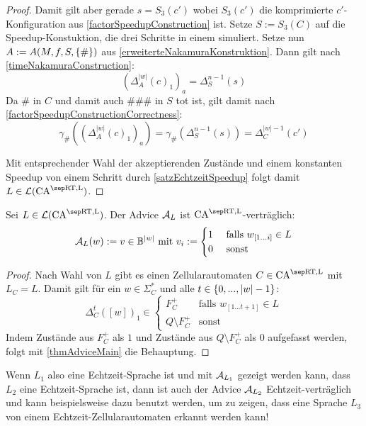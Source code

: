 \begin{proof}
    Damit gilt aber gerade $s = S_3(c')$ wobei $S_3(c')$ die komprimierte $c'$-Konfiguration aus \cref{factorSpeedupConstruction} ist.
    Setze $S := S_3(C)$ auf die Speedup-Konstuktion, die drei Schritte in einem simuliert.
    Setze nun $A := A(M, f, S, \{ {\#} \})$ aus \cref{erweiterteNakamuraKonstruktion}.
    Dann gilt nach \cref{timeNakamuraConstruction}:
    \[
        (\Delta^{ |w| }_A(c)_1)_a = \Delta_S^{n - 1}(s)
    \]
    Da $\#$ in $C$ und damit auch $\#\#\#$ in $S$ tot ist, gilt damit nach \cref{factorSpeedupConstructionCorrectness}:
    \[
        \gamma_\#((\Delta^{ |w| }_A(c)_1)_a) = \gamma_\#(\Delta_S^{n-1}(s)) = \Delta_C^{|w| - 1}(c')
    \]
    
    Mit entsprechender Wahl der akzeptierenden Zustände und einem konstanten Speedup von einem Schritt
    durch \cref{satzEchtzeitSpeedup} folgt damit $L \in \CAL{\CART, \CALeft}$.
\end{proof}

\begin{corollary}
    \label{folgerungThmMainAdv}
    Sei $L \in \CAL{\CART, \CALeft}$.
    Der Advice $\mathcal{A}_L$ ist $\CAM{\CART, \CALeft}$-verträglich:
    \[
        \mathcal{A}_L(w) := v \in \mathbb{B}^{|w|} \text{ mit } v_i :=
        \begin{cases}
            1 & \text{ falls } w_{[1...i]} \in L \\
            0 & \text{ sonst }
        \end{cases}
    \]
\end{corollary}
\begin{proof}
    Nach Wahl von $L$ gibt es einen Zellularautomaten $C \in \CAM{\CART, \CALeft}$
    mit $L_C = L$. Damit gilt für ein $w \in \Sigma_C^*$ und alle $t \in \{ {0, ..., |w|-1} \}$:
    \[
        \Delta_C^{t}([w])_1 \in
        \begin{cases}
            F_C^+ & \text{falls } w_{[1...t+1]} \in L \\
            Q \setminus F_C^+ & \text {sonst}
        \end{cases}
    \]
    Indem Zustände aus $F_C^+$ als $1$ und Zustände aus $Q \setminus F_C^+$ als $0$ aufgefasst werden, 
    folgt mit \cref{thmAdviceMain} die Behauptung.
\end{proof}

Wenn $L_1$ also eine Echtzeit-Sprache ist und mit $\mathcal{A}_{L_1}$ gezeigt werden kann,
dass $L_2$ eine Echtzeit-Sprache ist, dann ist auch der Advice $\mathcal{A}_{L_2}$ Echtzeit-verträglich
und kann beispielsweise dazu benutzt werden, um zu zeigen, dass eine Sprache $L_3$ von einem Echtzeit-Zellularautomaten erkannt werden kann!

